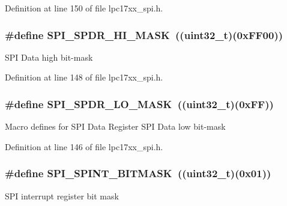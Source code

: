 \-Definition at line 150 of file lpc17xx\-\_\-spi.\-h.

\hypertarget{group___s_p_i___private___macros_gad1d95ddc30067dbe7e74550ab7f65257}{
\subsubsection[{\-S\-P\-I\-\_\-\-S\-P\-D\-R\-\_\-\-H\-I\-\_\-\-M\-A\-S\-K}]{\setlength{\rightskip}{0pt plus 5cm}\#define {\bf \-S\-P\-I\-\_\-\-S\-P\-D\-R\-\_\-\-H\-I\-\_\-\-M\-A\-S\-K}~((uint32\-\_\-t)(0x\-F\-F00))}}\label{group___s_p_i___private___macros_gad1d95ddc30067dbe7e74550ab7f65257}
\-S\-P\-I \-Data high bit-\/mask 

\-Definition at line 148 of file lpc17xx\-\_\-spi.\-h.

\hypertarget{group___s_p_i___private___macros_ga93c8aac945eab836a332ed8a9575c0a5}{
\subsubsection[{\-S\-P\-I\-\_\-\-S\-P\-D\-R\-\_\-\-L\-O\-\_\-\-M\-A\-S\-K}]{\setlength{\rightskip}{0pt plus 5cm}\#define {\bf \-S\-P\-I\-\_\-\-S\-P\-D\-R\-\_\-\-L\-O\-\_\-\-M\-A\-S\-K}~((uint32\-\_\-t)(0x\-F\-F))}}\label{group___s_p_i___private___macros_ga93c8aac945eab836a332ed8a9575c0a5}
\-Macro defines for \-S\-P\-I \-Data \-Register \-S\-P\-I \-Data low bit-\/mask 

\-Definition at line 146 of file lpc17xx\-\_\-spi.\-h.

\hypertarget{group___s_p_i___private___macros_gad58f195527f4c00f4285ab50d874c672}{
\subsubsection[{\-S\-P\-I\-\_\-\-S\-P\-I\-N\-T\-\_\-\-B\-I\-T\-M\-A\-S\-K}]{\setlength{\rightskip}{0pt plus 5cm}\#define {\bf \-S\-P\-I\-\_\-\-S\-P\-I\-N\-T\-\_\-\-B\-I\-T\-M\-A\-S\-K}~((uint32\-\_\-t)(0x01))}}\label{group___s_p_i___private___macros_gad58f195527f4c00f4285ab50d874c672}
\-S\-P\-I interrupt register bit mask 

